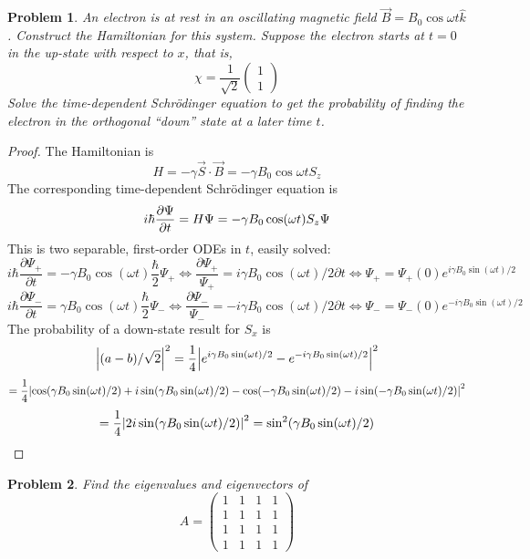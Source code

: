 \documentclass{article}
\newtheorem{plm}{Problem}
\begin{document}
\begin{plm}
  An electron is at rest in an oscillating magnetic field $\vec{B} = B_{0}\cos\omega t \hat{k}$.
  Construct the Hamiltonian for this system.
  Suppose the electron starts at $t = 0$ in the up-state with respect to $x$, that is,
  \[
    \chi = \frac{1}{\sqrt{2}}
    \begin{pmatrix}
      1 \\
      1
    \end{pmatrix}
  \]
  Solve the time-dependent Schr\"odinger equation to get the probability of finding the electron in the orthogonal ``down'' state at a later time $t$.
\end{plm}

\begin{proof}
  The Hamiltonian is
  \[
    H = - \gamma\vec{S} \cdot \vec{B} = -\gamma B_{0}\cos\omega t S_{z}
  \]
  The corresponding time-dependent Schr\"odinger equation is
  \[
    i\hbar\pdv{\Psi}{t} = H\Psi
    = -\gamma B_{0}\cos(\omega t)S_{z}\Psi
  \]
  This is two separable, first-order ODEs in $t$, easily solved:
  \[
    i\hbar\frac{\partial \Psi_{+}}{\partial t} = -\gamma B_{0}\cos(\omega t)\frac{\hbar}{2}\Psi_{+}
    \Leftrightarrow \frac{\partial \Psi_{+}}{\Psi_{+}} = i\gamma B_{0}\cos(\omega t)/2\partial t
    \Leftrightarrow \Psi_{+} = \Psi_{+}(0)e^{i\gamma B_{0}\sin(\omega t)/2}
  \]
  \[
    i\hbar\frac{\partial \Psi_{-}}{\partial t} = \gamma B_{0}\cos(\omega t)\frac{\hbar}{2}\Psi_{-}
    \Leftrightarrow \frac{\partial \Psi_{-}}{\Psi_{-}} = -i\gamma B_{0}\cos(\omega t)/2\partial t
    \Leftrightarrow \Psi_{-} = \Psi_{-}(0)e^{-i\gamma B_{0}\sin(\omega t)/2}
  \]
  The probability of a down-state result for $S_{x}$ is
  \[
    \qty|(a - b) / \sqrt{2}|^{2} = \frac{1}{4}\qty|e^{i\gamma B_{0}\sin(\omega t)/2} - e^{-i\gamma B_{0}\sin(\omega t)/2}|^{2}
  \]
  \[
    = \frac{1}{4}\qty|\cos(\gamma B_{0}\sin(\omega t) / 2) + i\sin(\gamma B_{0}\sin(\omega t) / 2) - \cos(-\gamma B_{0}\sin(\omega t) / 2)
    - i\sin(-\gamma B_{0}\sin(\omega t) / 2)|^{2}
  \]
  \[
    = \frac{1}{4}\qty|2i\sin(\gamma B_{0}\sin(\omega t) / 2)|^{2} = \sin^{2}(\gamma B_{0}\sin(\omega t) / 2)
  \]
\end{proof}

\begin{plm}
  Find the eigenvalues and eigenvectors of
  \[
    A =
    \begin{pmatrix}
      1 & 1 & 1 & 1 \\
      1 & 1 & 1 & 1 \\
      1 & 1 & 1 & 1 \\
      1 & 1 & 1 & 1
    \end{pmatrix}
  \]
\end{plm}
\end{document}
